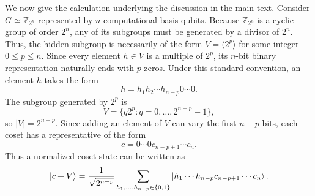 \label{app:transversal_hadamard_sampling}
We now give the calculation underlying the  discussion in the main text.
Consider $G\simeq\mathbb{Z}_{2^n}$ represented by $n$ computational-basis qubits. 
Because $\mathbb{Z}_{2^n}$ is a cyclic group of order $2^n$, any of its subgroups must be generated by a divisor of $2^n$. 
Thus, the hidden subgroup is necessarily of the form $V = \langle 2^p \rangle$ for some integer $0 \le p \le n$. 
Since every element $h \in V$ is a multiple of $2^p$, its $n$-bit binary representation naturally ends with $p$ zeros. 
Under this standard convention, an element $h$ takes the form
\begin{equation}
    h=h_1h_2\cdots h_{n-p}0\cdots 0.
\end{equation}
The subgroup generated by $2^p$ is
\begin{equation}
    V=\{q2^p:q=0,\ldots,2^{n-p}-1\},
\end{equation}
so $|V|=2^{n-p}$.
Since adding an element of $V$ can vary the first $n-p$ bits, each coset has a representative of the form
\begin{equation}
    c=0\cdots 0c_{n-p+1}\cdots c_n.
\end{equation}
Thus a normalized coset state can be written as
\begin{equation}
    \ket{c+V}
    =
    \frac{1}{\sqrt{2^{n-p}}}
    \sum_{h_1,\ldots,h_{n-p}\in\{0,1\}}
    \ket{h_1\cdots h_{n-p}c_{n-p+1}\cdots c_n}.
    \label{eq:coset_state_z2n}
\end{equation}

